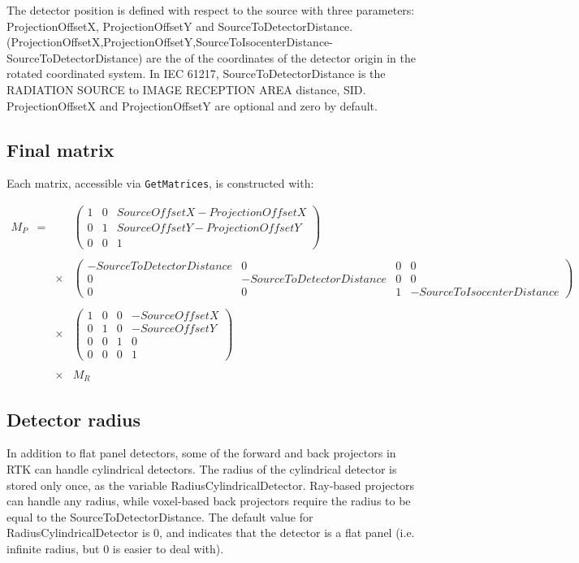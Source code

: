 \documentclass{article}
\begin{document}
The detector position is defined with respect to the source with three parameters: ProjectionOffsetX, ProjectionOffsetY and SourceToDetectorDistance. (ProjectionOffsetX,ProjectionOffsetY,SourceToIsocenterDistance-SourceToDetectorDistance) are the of the coordinates of the detector origin in the rotated coordinated system. In IEC 61217, SourceToDetectorDistance is the RADIATION SOURCE to IMAGE RECEPTION AREA distance, SID. ProjectionOffsetX and ProjectionOffsetY are optional and zero by default.

\subsection{Final matrix}

Each matrix, accessible via \verb+GetMatrices+, is constructed with:

$$
\begin{array}{lcll}
  M_P & = & & %
  \begin{pmatrix}
    1 & 0 & SourceOffsetX-ProjectionOffsetX  \\
    0 & 1 & SourceOffsetY-ProjectionOffsetY  \\
    0 & 0 & 1
  \end{pmatrix} %
  \\ \\ & & \times & %
  \begin{pmatrix}
    -SourceToDetectorDistance & 0 & 0 & 0  \\
    0 & -SourceToDetectorDistance & 0 & 0  \\
    0 & 0 & 1 & -SourceToIsocenterDistance
  \end{pmatrix} %
  \\ \\ & & \times & %
  \begin{pmatrix}
    1 & 0 & 0 & -SourceOffsetX  \\
    0 & 1 & 0 & -SourceOffsetY  \\
    0 & 0 & 1 & 0 \\
    0 & 0 & 0 & 1
  \end{pmatrix} %
  \\ \\ & & \times & %
  M_R
\end{array}
$$

\subsection{Detector radius}

In addition to flat panel detectors, some of the forward and back projectors in RTK can handle cylindrical detectors. The radius of the cylindrical detector is stored only once, as the variable RadiusCylindricalDetector. Ray-based projectors can handle any radius, while voxel-based back projectors require the radius to be equal to the SourceToDetectorDistance. The default value for RadiusCylindricalDetector is 0, and indicates that the detector is a flat panel (i.e. infinite radius, but 0 is easier to deal with).
\end{document}
